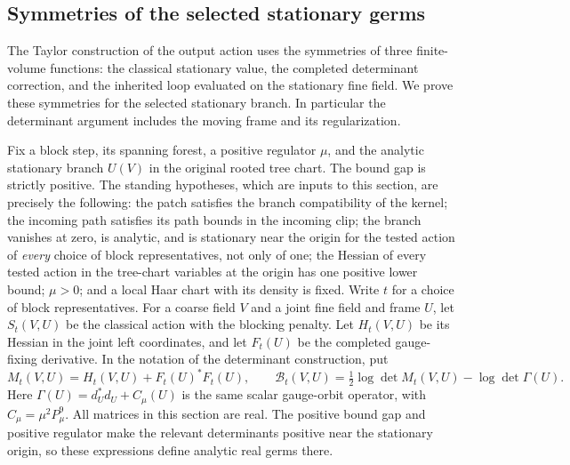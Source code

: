 \subsection{Symmetries of the selected stationary germs}
\label{sec:stationary-germ-symmetry}
The Taylor construction of the output action uses the symmetries of
three finite-volume functions: the classical stationary value, the
completed determinant correction, and the inherited loop evaluated on
the stationary fine field. We prove these symmetries for the selected
stationary branch. In particular the determinant argument includes the
moving frame and its regularization.

Fix a block step, its spanning forest, a positive regulator $\mu$, and
the analytic stationary branch $U(V)$ in the original rooted tree
chart. The bound gap is strictly positive. The standing hypotheses,
which are inputs to this section, are precisely the following: the
patch satisfies the branch compatibility of the kernel; the incoming
path satisfies its path bounds in the incoming clip; the branch
vanishes at zero, is analytic, and is stationary near the origin for
the tested action of \emph{every} choice of block representatives, not
only of one; the Hessian of every tested action in the tree-chart
variables at the origin has one positive lower bound; $\mu>0$; and a
local Haar chart with its density is fixed. Write $t$ for a choice of
block representatives. For a coarse field $V$ and a joint fine field
and frame $U$, let $S_t(V,U)$ be the classical action with the blocking
penalty. Let $H_t(V,U)$ be its Hessian in the joint left coordinates,
and let $F_t(U)$ be the completed gauge-fixing derivative. In the
notation of the determinant construction, put
\[
 M_t(V,U)=H_t(V,U)+F_t(U)^*F_t(U),\qquad
 \mathcal B_t(V,U)=\tfrac12\log\det M_t(V,U)
                                      -\log\det\Gamma(U).
\]
Here $\Gamma(U)=d_U^*d_U+C_\mu(U)$ is the same scalar gauge-orbit
operator, with $C_\mu=\mu^2P_\mu^9$. All matrices in this section
are real. The positive bound gap and positive regulator make the
relevant determinants positive near the stationary origin, so these
expressions define analytic real germs there.

